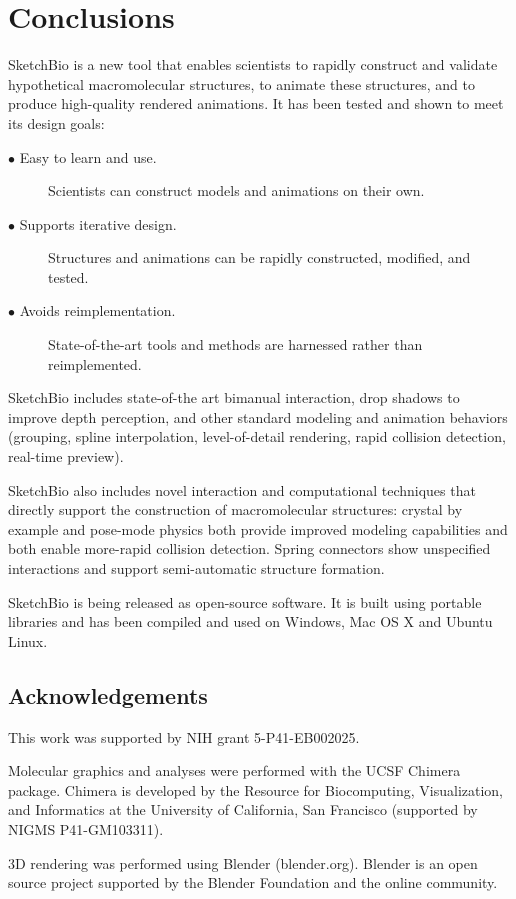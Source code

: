 \documentclass[twocolumn]{bmcart}%
\begin{document}
\section*{Conclusions}
SketchBio is a new tool that enables scientists to rapidly construct and validate hypothetical macromolecular structures, to animate these structures, and to produce high-quality rendered animations.  It has been tested and shown to meet its design goals:
\begin{description}
  \item[$\bullet$ Easy to learn and use.] Scientists can construct models and animations on their own.
  \item[$\bullet$ Supports iterative design.] Structures and animations can be rapidly constructed, modified, and tested.
  \item[$\bullet$ Avoids reimplementation.] State-of-the-art tools and methods are harnessed rather than reimplemented.
\end{description}

SketchBio includes state-of-the art bimanual interaction, drop shadows to improve depth perception, and other standard modeling and animation behaviors (grouping, spline interpolation, level-of-detail rendering, rapid collision detection, real-time preview).

SketchBio also includes novel interaction and computational techniques that directly support the construction of macromolecular structures: crystal by example and pose-mode physics both provide improved modeling capabilities and both enable more-rapid collision detection.  Spring connectors show unspecified interactions and support semi-automatic structure formation.

SketchBio is being released as open-source software.  It is built using portable libraries and has been compiled and used on Windows, Mac OS X and Ubuntu Linux.

\subsection*{Acknowledgements}
This work was supported by NIH grant 5-P41-EB002025.

Molecular graphics and analyses were performed with the UCSF Chimera package. Chimera is developed by the Resource for Biocomputing, Visualization, and Informatics at the University of California, San Francisco (supported by NIGMS P41-GM103311).

3D rendering was performed using Blender (blender.org). Blender is an open source project supported by the Blender Foundation and the online community.
\end{document}
